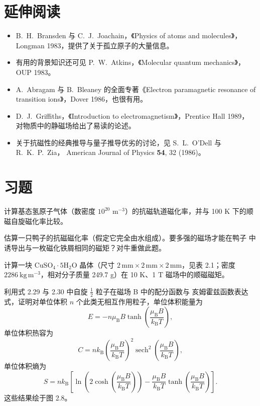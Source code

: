 \section*{延伸阅读}

\begin{itemize}[itemsep=0.2em]
\item B.~H.~Bransden 与 C.~J.~Joachain，《Physics of atoms and molecules》，
Longman 1983，提供了关于孤立原子的大量信息。
\item 有用的背景知识还可见 P.~W.~Atkins，《Molecular quantum mechanics》，
OUP 1983。
\item A.~Abragam 与 B.~Bleaney 的全面专著《Electron paramagnetic resonance of
transition ions》，Dover 1986，也很有用。
\item D.~J.~Griffiths，《Introduction to electromagnetism》，Prentice Hall 1989，
对物质中的静磁场给出了易读的论述。
\item 关于抗磁性的经典推导与量子推导优劣的讨论，见 S.~L.~O'Dell 与 R.~K.~P.~Zia，
American Journal of Physics \textbf{54}, 32 (1986)。
\end{itemize}

\section*{习题}

 计算基态氢原子气体（数密度 $10^{20}$ m$^{-3}$）的抗磁轨道磁化率，并与
100 K 下的顺磁自旋磁化率比较。

 估算一只鸭子的抗磁磁化率（假定它完全由水组成）。要多强的磁场才能在鸭子
中诱导出与一枚磁化铁屑相同的磁矩？对牛重做此题。

 计算一块 $\mathrm{CuSO_4\cdot5H_2O}$ 晶体（尺寸
$2\,\mathrm{mm}\times2\,\mathrm{mm}\times2\,\mathrm{mm}$，见表 2.1；密度
$2286\ \mathrm{kg\,m^{-3}}$，相对分子质量 249.7 g）在 10 K、1 T 磁场中的顺磁磁矩。

 利用式 2.29 与 2.30 中自旋 $\frac{1}{2}$ 粒子在磁场 B 中的配分函数与
亥姆霍兹函数表达式，证明对单位体积 $n$ 个此类无相互作用粒子，单位体积能量为
\begin{equation*}
E = -n\mu_{\mathrm{B}}B\tanh\left(\frac{\mu_{\mathrm{B}}B}{k_{\mathrm{B}}T}\right),\tag{2.74}
\end{equation*}
单位体积热容为
\begin{equation*}
C = nk_{\mathrm{B}}\left(\frac{\mu_{\mathrm{B}}B}{k_{\mathrm{B}}T}\right)^{2}\operatorname{sech}^{2}\left(\frac{\mu_{\mathrm{B}}B}{k_{\mathrm{B}}T}\right),\tag{2.75}
\end{equation*}
单位体积熵为
\begin{equation*}
S = nk_{\mathrm{B}}\left[\ln\left(2\cosh\left(\frac{\mu_{\mathrm{B}}B}{k_{\mathrm{B}}T}\right)\right) - \frac{\mu_{\mathrm{B}}B}{k_{\mathrm{B}}T}\tanh\left(\frac{\mu_{\mathrm{B}}B}{k_{\mathrm{B}}T}\right)\right].\tag{2.76}
\end{equation*}
这些结果绘于图 2.8。


